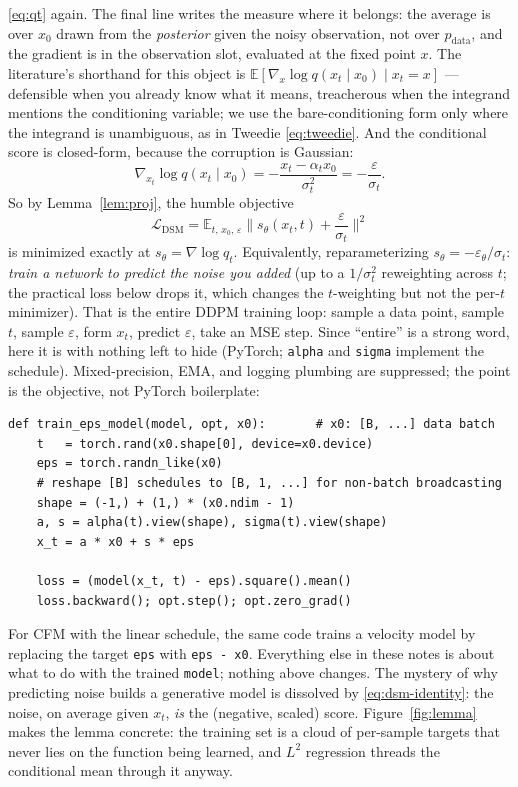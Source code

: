 \documentclass[10pt,a4paper]{article}
\newcommand{\E}{\mathbb{E}}
\newcommand{\score}{s}
\newcommand{\veps}{\varepsilon}
\begin{document}
\eqref{eq:qt} again. The final line writes the measure where it belongs:
the average is over $x_0$ drawn from the \emph{posterior} given the
noisy observation, not over $p_{\mathrm{data}}$, and the gradient is in
the observation slot, evaluated at the fixed point $x$. The literature's
shorthand for this object is
$\E[\nabla_x \log q(x_t \mid x_0) \mid x_t = x]$ --- defensible when you
already know what it means, treacherous when the integrand mentions the
conditioning variable; we use the bare-conditioning form only where the
integrand is unambiguous, as in Tweedie \eqref{eq:tweedie}. And the
conditional score is closed-form, because the corruption is Gaussian:
\begin{equation}
\nabla_{x_t} \log q(x_t \mid x_0)
= -\frac{x_t - \alpha_t x_0}{\sigma_t^2}
= -\frac{\veps}{\sigma_t}.
\label{eq:cond-score}
\end{equation}
So by Lemma~\ref{lem:proj}, the humble objective
\begin{equation}
\boxed{\;\mathcal{L}_{\mathrm{DSM}}
= \E_{t,\, x_0,\, \veps}
\Big\| \score_\theta(x_t, t) + \frac{\veps}{\sigma_t} \Big\|^2\;}
\label{eq:dsm}
\end{equation}
is minimized exactly at $\score_\theta = \nabla\log q_t$. Equivalently,
reparameterizing $\score_\theta = -\veps_\theta/\sigma_t$: \emph{train a
network to predict the noise you added} (up to a $1/\sigma_t^2$
reweighting across $t$; the practical loss below drops it, which changes
the $t$-weighting but not the per-$t$ minimizer). That is the entire DDPM training
loop: sample a data point, sample $t$, sample $\veps$, form $x_t$, predict
$\veps$, take an MSE step. Since ``entire'' is a strong word, here it is
with nothing left to hide (PyTorch; \texttt{alpha} and \texttt{sigma}
implement the schedule). Mixed-precision, EMA, and logging plumbing are
suppressed; the point is the objective, not PyTorch boilerplate:
\begin{lstlisting}
def train_eps_model(model, opt, x0):       # x0: [B, ...] data batch
    t   = torch.rand(x0.shape[0], device=x0.device)
    eps = torch.randn_like(x0)
    # reshape [B] schedules to [B, 1, ...] for non-batch broadcasting
    shape = (-1,) + (1,) * (x0.ndim - 1)
    a, s = alpha(t).view(shape), sigma(t).view(shape)
    x_t = a * x0 + s * eps

    loss = (model(x_t, t) - eps).square().mean()
    loss.backward(); opt.step(); opt.zero_grad()
\end{lstlisting}
For CFM with the linear schedule, the same code trains a velocity model
by replacing the target \texttt{eps} with \texttt{eps - x0}.
Everything else in these notes is about what to do with the trained
\texttt{model}; nothing above changes. The mystery of why predicting
noise builds a
generative model is dissolved by \eqref{eq:dsm-identity}: the noise, on
average given $x_t$, \emph{is} the (negative, scaled) score.
Figure~\ref{fig:lemma} makes the lemma concrete: the training set is a
cloud of per-sample targets that never lies on the function being learned,
and $L^2$ regression threads the conditional mean through it anyway.
\end{document}
